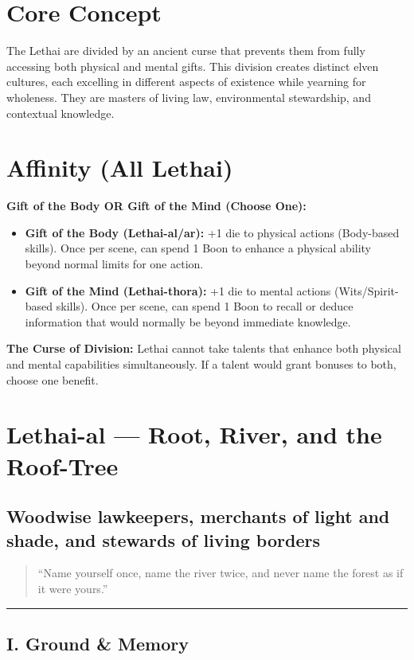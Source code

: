 \documentclass[11pt]{article}
\begin{document}
\section*{Core Concept}
The Lethai are divided by an ancient curse that prevents them from fully accessing both physical and mental gifts. This division creates distinct elven cultures, each excelling in different aspects of existence while yearning for wholeness. They are masters of living law, environmental stewardship, and contextual knowledge.

\section*{Affinity (All Lethai)}
\textbf{Gift of the Body OR Gift of the Mind (Choose One):}
\begin{itemize}
  \item \textbf{Gift of the Body (Lethai-al/ar):} +1 die to physical actions (Body-based skills). Once per scene, can spend 1 Boon to enhance a physical ability beyond normal limits for one action.
  \item \textbf{Gift of the Mind (Lethai-thora):} +1 die to mental actions (Wits/Spirit-based skills). Once per scene, can spend 1 Boon to recall or deduce information that would normally be beyond immediate knowledge.
\end{itemize}

\textbf{The Curse of Division:} Lethai cannot take talents that enhance both physical and mental capabilities simultaneously. If a talent would grant bonuses to both, choose one benefit.

\section{Lethai-al --- Root, River, and the Roof-Tree}

\subsection*{Woodwise lawkeepers, merchants of light and shade, and stewards of living borders}

\begin{quote}
``Name yourself once, name the river twice, and never name the forest as if it were yours.''
\end{quote}

\medskip\hrule\medskip

\subsection{I. Ground \& Memory}
\end{document}
